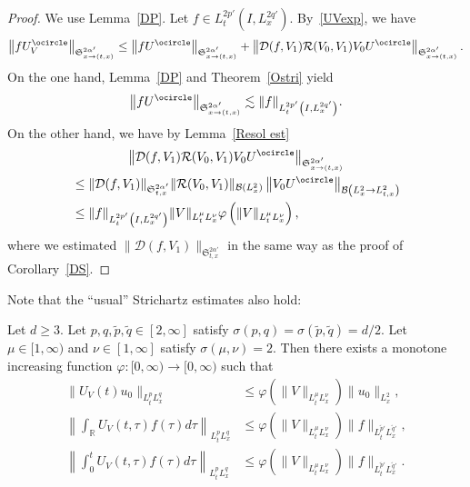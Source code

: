 \documentclass[AHL,Unicode,longabstracts,MathTools,published]{cedram}
\newcommand{\CB}{\mathcal{B}}
\newcommand{\CD}{\mathcal{D}}
\newcommand{\CR}{\mathcal{R}}
\newcommand{\FS}{\mathfrak{S}}
\newcommand{\al}{\alpha}
\newcommand{\ph}{\varphi}
\newcommand{\ta}{\tau}
\newcommand{\si}{\sigma}
\newcommand{\wt}{\widetilde}
\renewcommand{\No}[1]{\left\| #1 \right\|}
\newcommand{\I}{\infty}
\newcommand{\tx}{{t,x}}
\newcommand{\Sxtx}{{\FS^{2\al'}_{x \to (t,x)}}}
\newcommand{\R}{\mathbb{R}}
\newcommand{\oc}{\ocircle}
\newcommand{\ls}{\lesssim}
\begin{document}
\begin{proof}
We use Lemma~\ref{DP}. Let $f \in L^{2p'}_t(I,L^{2q'}_x)$. By~\eqref{UVexp}, we have
\begin{align}
\left\|f U_V^\oc\right\|_{\Sxtx} \le \left\|f U^\oc\right\|_{\Sxtx} + \left\|\CD(f,V_1) \CR(V_0,V_1) V_0 U^\oc\right\|_{\Sxtx}.
\end{align}
On the one hand, Lemma~\ref{DP} and Theorem~\ref{Ostri} yield
\begin{align}
\left\|f U^\oc\right\|_{\Sxtx} \ls \|f\|_{L^{2p'}_t\left(I,L^{2q'}_x\right)}.
\end{align}
On the other hand, we have by Lemma~\ref{Resol est}
\begin{multline}
\left\|\CD(f,V_1) \CR(V_0,V_1) V_0 U^\oc\right\|_{\Sxtx} 
\\
\begin{aligned}
&\le \|\CD(f,V_1)\|_{\FS^{2\al'}_\tx} \|\CR(V_0,V_1)\|_{\CB\left(L^2_x\right)} \left\|V_0 U^\oc\right\|_{\CB\left(L^2_x \to L^2_\tx\right)} \\
&\le \|f\|_{L^{2p'}_t\left(I,L^{2q'}_x\right)} \|V\|_{L^\mu_t L^\nu_x} \ph\left(\|V\|_{L^\mu_t L^\nu_x}\right),
\end{aligned}
\end{multline}
where we estimated $\|\CD(f,V_1)\|_{\FS^{2\al'}_\tx}$ in the same way as the proof of Corollary~\ref{DS}.
\end{proof}

Note that the ``usual'' Strichartz estimates also hold:

\begin{lemm}\label{UVStri}
Let $d \geq 3$. Let $p,q,\wt{p},\wt{q} \in [2, \I]$ satisfy $\si(p,q) = \si(\wt{p},\wt{q})=d/2$. Let $\mu \in [1, \I)$ and $\nu \in [1, \I]$ satisfy $\si(\mu,\nu) = 2$. Then there exists a monotone increasing function $\ph:[0,\I) \to [0, \I)$ such that
\begin{align}
\|U_V(t)u_0\|_{L^p_tL^q_x}
&\leq \ph\left(\|V\|_{L^\mu_t L^\nu_x}\right) \|u_0\|_{L^2_x}, \label{UVStri1}
\\
\No{ \int_\R U_V(t,\ta)f(\ta) d\ta }_{L^p_tL^q_x}
&\leq \ph\left(\|V\|_{L^\mu_t L^\nu_x}\right) \|f\|_{L^{\wt{p}'}_t L^{\wt{q}'}_x}, \label{UVStri2}
\\
\No{ \int_0^t U_V(t,\ta)f(\ta) d\ta}_{L^p_tL^q_x}
&\leq \ph\left(\|V\|_{L^\mu_t L^\nu_x}\right) \|f\|_{L^{\wt{p}'}_t L^{\wt{q}'}_x}. \label{UVStri3}
\end{align}
\end{lemm}
\end{document}
